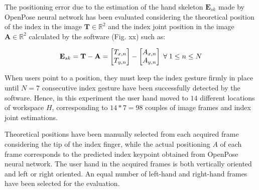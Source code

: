 \documentclass[a4paper, 10 pt, conference]{ieeeconf}      %
\begin{document}
The positioning error due to the estimation of the hand skeleton $\mathbf{E}_{sk}$ made by OpenPose neural network has been evaluated considering the theoretical position of the index in the image $\mathbf{T} \in \mathbb{R}^2$ and the index joint position in the image $\mathbf{A} \in \mathbb{R}^2$ calculated by the software (Fig. xx) such as:

\begin{equation}
\mathbf{E}_{sk} = \mathbf{T} - \mathbf{A} = \begin{bmatrix}
T_{x,n}\\
T_{y,n}
\end{bmatrix}-
\begin{bmatrix}
A_{x,n}\\
A_{y,n}
\end{bmatrix}
\thickspace
\forall \thickspace 1 \leq n \leq N
\end{equation}

When users point to a position, they must keep the index gesture firmly in place until $N = 7$ consecutive index gesture have been successfully detected by the software. Hence, in this experiment the user hand moved to $14$ different locations of workspace $H$, corresponding to $14 * 7 = 98$ couples of image frames and index joint estimations.

Theoretical positions have been manually selected from each acquired frame considering the tip of the index finger, while the actual positioning $A$ of each frame corresponds to the predicted index keypoint obtained from OpenPose neural network. The user hand in the acquired frames is both vertically oriented and left or right oriented. An equal number of left-hand and right-hand frames have been selected for the evaluation.
\end{document}
